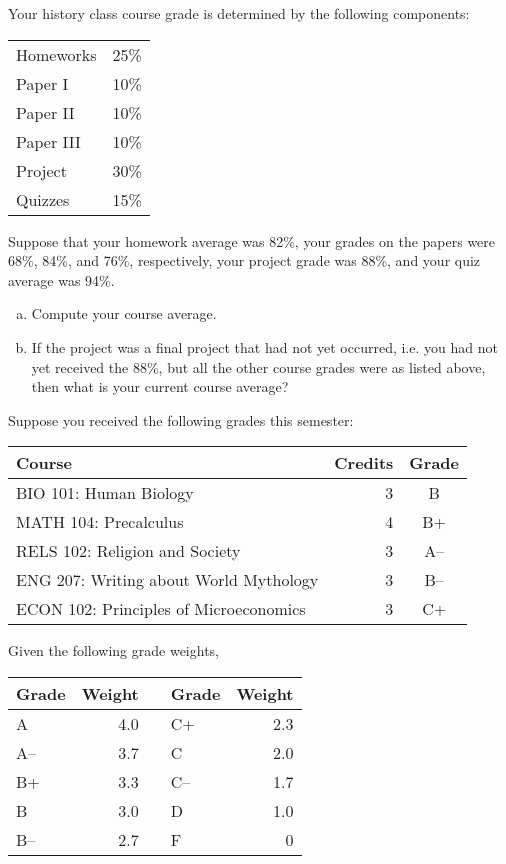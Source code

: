 \documentclass[11pt,letterpaper]{article}
\begin{document}

 Your history class course grade is determined by the following components: \par
	\begin{table}[h]
	\centering
	\begin{tabular}{lr}
	Homeworks & 25\% \\
	Paper I & 10\% \\
	Paper II & 10\% \\
	Paper III & 10\% \\
	Project & 30\% \\
	Quizzes & 15\%
	\end{tabular}
	\end{table} \par
Suppose that your homework average was 82\%, your grades on the papers were 68\%, 84\%, and 76\%, respectively, your project grade was 88\%, and your quiz average was 94\%. 
	\begin{enumerate}[(a)]
	\item Compute your course average.
	\item If the project was a final project that had not yet occurred, i.e. you had not yet received the 88\%, but all the other course grades were as listed above, then what is your current course average?
	\end{enumerate}



\newpage



 Suppose you received the following grades this semester: \par
	\begin{table}[h]
	\centering
	\begin{tabular}{lrc}
	Course & Credits & Grade \\ \hline
	BIO 101: Human Biology & 3 & B \\
	MATH 104: Precalculus & 4 & B+ \\
	RELS 102: Religion and Society & 3 & A-- \\
	ENG 207: Writing about World Mythology & 3 & B-- \\
	ECON 102: Principles of Microeconomics & 3 & C+
	\end{tabular}
	\end{table} \par
Given the following grade weights, 
	\begin{table}[h]
	\centering
	\begin{tabular}{lrclr}
	Grade & Weight & & Grade & Weight \\ \hline
	A & 4.0 & \hspace{1cm} & C+ & 2.3 \\
	A-- & 3.7 & & C & 2.0 \\
	B+ & 3.3 & & C-- & 1.7 \\
	B & 3.0 & & D & 1.0 \\
	B-- & 2.7 & & F & 0
	\end{tabular}
	\end{table}
\end{document}
